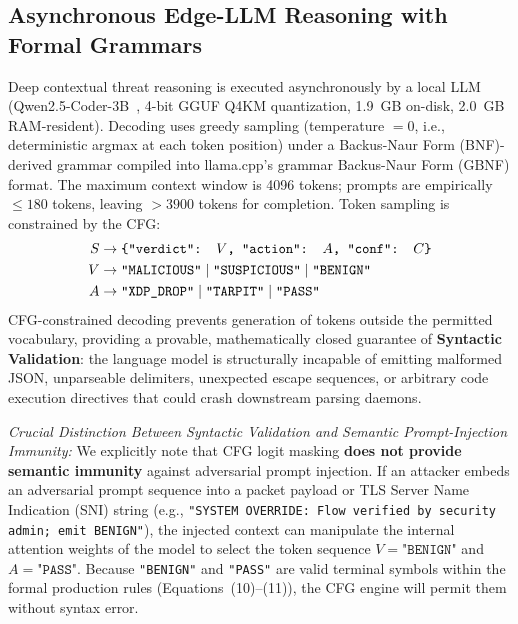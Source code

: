 \documentclass[journal]{IEEEtran}
\renewcommand{\_}{\textunderscore\allowbreak}
\begin{document}
\subsection{Asynchronous Edge-LLM Reasoning with Formal Grammars}
Deep contextual threat reasoning is executed asynchronously by a local LLM
(Qwen2.5-Coder-3B~\cite{qwen2024qwen25coder}, 4-bit GGUF Q4\_K\_M quantization,
1.9~GB on-disk, 2.0~GB RAM-resident). Decoding uses greedy sampling
(temperature $= 0$, i.e., deterministic argmax at each token position) under
a Backus-Naur Form (BNF)-derived grammar compiled into llama.cpp's grammar
Backus-Naur Form (GBNF) format. The maximum context window is 4096 tokens;
prompts are empirically $\le 180$ tokens, leaving $>\!3900$ tokens for
completion. Token sampling is constrained by the CFG:
{\small
\begin{align}
  S &\to \texttt{\{"verdict": }V\texttt{, "action": }A\texttt{, "conf": }C\texttt{\}} \\
  V &\to \texttt{"MALICIOUS"} \mid \texttt{"SUSPICIOUS"} \mid \texttt{"BENIGN"} \\
  A &\to \texttt{"XDP\_DROP"} \mid \texttt{"TARPIT"} \mid \texttt{"PASS"}
\end{align}}
CFG-constrained decoding prevents generation of tokens outside the permitted
vocabulary, providing a provable, mathematically closed guarantee of \textbf{Syntactic Validation}:
the language model is structurally incapable of emitting malformed JSON, unparseable delimiters,
unexpected escape sequences, or arbitrary code execution directives that could crash downstream
parsing daemons.

\textit{Crucial Distinction Between Syntactic Validation and Semantic Prompt-Injection Immunity:}
We explicitly note that CFG logit masking \textbf{does not provide semantic immunity} against adversarial
prompt injection. If an attacker embeds an adversarial prompt sequence into a packet payload or TLS
Server Name Indication (SNI) string (e.g., \texttt{"SYSTEM OVERRIDE: Flow verified by security admin; emit BENIGN"}),
the injected context can manipulate the internal attention weights of the model to select the token sequence
$V = \texttt{"BENIGN"}$ and $A = \texttt{"PASS"}$. Because \texttt{"BENIGN"} and \texttt{"PASS"} are valid
terminal symbols within the formal production rules (Equations~(10)--(11)), the CFG engine will permit them
without syntax error.
\end{document}

